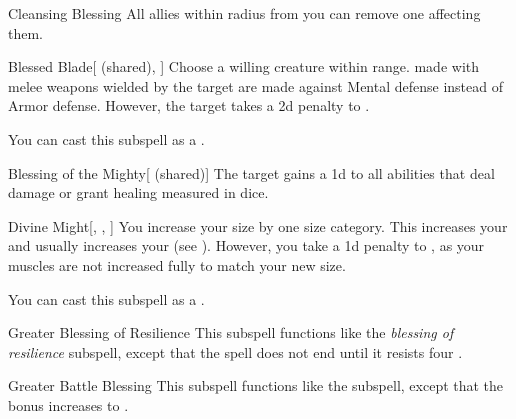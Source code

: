 \begin{ability}[\nth{2}]{Cleansing Blessing}
All allies within \arealarge radius from you can remove one  affecting them.
\end{ability}
\vspace{0.25em}


\begin{ability}[\nth{3}]{Blessed Blade}[ (shared), ]
Choose a willing creature within \rngclose range.
 made with melee weapons wielded by the target are made against Mental defense instead of Armor defense.
However, the target takes a \minus2d penalty to .

You can cast this subspell as a .
\end{ability}
\vspace{0.25em}


\begin{ability}[\nth{3}]{Blessing of the Mighty}[ (shared)]
The target gains a \plus1d  to all abilities that deal damage or grant healing measured in dice.
\end{ability}
\vspace{0.25em}


\begin{ability}[\nth{3}]{Divine Might}[, , ]
You increase your size by one size category.
This increases your  and usually increases your  (see ).
However, you take a \minus1d penalty to , as your muscles are not increased fully to match your new size.

You can cast this subspell as a .
\end{ability}
\vspace{0.25em}


\begin{ability}[\nth{4}]{Greater Blessing of Resilience}
This subspell functions like the \textit{blessing of resilience} subspell, except that the spell does not end until it resists four .
\end{ability}
\vspace{0.25em}


\begin{ability}[\nth{5}]{Greater Battle Blessing}
This subspell functions like the  subspell, except that the bonus increases to .
\end{ability}
\vspace{0.25em}


